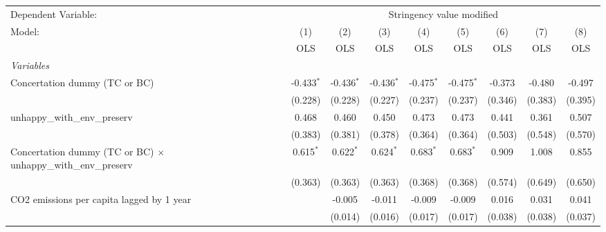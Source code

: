 
\begingroup
\centering
\begin{tabular}{lcccccccc}
   \toprule
   Dependent Variable: & \multicolumn{8}{c}{Stringency value modified}\\
   Model:                                                                 & (1)          & (2)          & (3)          & (4)          & (5)          & (6)           & (7)          & (8)\\  
                                                                          &  OLS         & OLS          & OLS          & OLS          & OLS          & OLS           & OLS          & OLS\\  
   \midrule
   \emph{Variables}\\
   Concertation dummy (TC or BC)                                          & -0.433$^{*}$ & -0.436$^{*}$ & -0.436$^{*}$ & -0.475$^{*}$ & -0.475$^{*}$ & -0.373        & -0.480       & -0.497\\   
                                                                          & (0.228)      & (0.228)      & (0.227)      & (0.237)      & (0.237)      & (0.346)       & (0.383)      & (0.395)\\   
   unhappy\_with\_env\_preserv                                            & 0.468        & 0.460        & 0.450        & 0.473        & 0.473        & 0.441         & 0.361        & 0.507\\   
                                                                          & (0.383)      & (0.381)      & (0.378)      & (0.364)      & (0.364)      & (0.503)       & (0.548)      & (0.570)\\   
   Concertation dummy (TC or BC) $\times$ unhappy\_with\_env\_preserv     & 0.615$^{*}$  & 0.622$^{*}$  & 0.624$^{*}$  & 0.683$^{*}$  & 0.683$^{*}$  & 0.909         & 1.008        & 0.855\\   
                                                                          & (0.363)      & (0.363)      & (0.363)      & (0.368)      & (0.368)      & (0.574)       & (0.649)      & (0.650)\\   
   CO2 emissions per capita lagged by 1 year                              &              & -0.005       & -0.011       & -0.009       & -0.009       & 0.016         & 0.031        & 0.041\\   
                                                                          &              & (0.014)      & (0.016)      & (0.017)      & (0.017)      & (0.038)       & (0.038)      & (0.037)\\   

\end{tabular}
